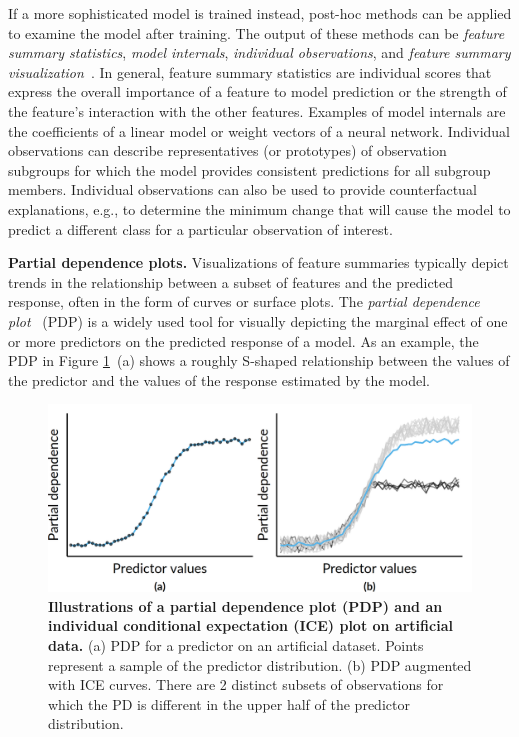 \documentclass[
  oneside]{book}
\begin{document}
If a more sophisticated model is trained instead, post-hoc methods can be applied to examine the model after training.
The output of these methods can be \emph{feature summary statistics}, \emph{model internals}, \emph{individual observations}, and \emph{feature summary visualization}~\autocite{molnar2020interpretable}.
In general, feature summary statistics are individual scores that express the overall importance of a feature to model prediction or the strength of the feature's interaction with the other features.
Examples of model internals are the coefficients of a linear model or weight vectors of a neural network.
Individual observations can describe representatives (or prototypes) of observation subgroups for which the model provides consistent predictions for all subgroup members.
Individual observations can also be used to provide counterfactual explanations, e.g., to determine the minimum change that will cause the model to predict a different class for a particular observation of interest.

\textbf{Partial dependence plots.} Visualizations of feature summaries typically depict trends in the relationship between a subset of features and the predicted response, often in the form of curves or surface plots.
The \emph{partial dependence plot}~\autocite{Friedman:PDP2001} (PDP) is a widely used tool for visually depicting the marginal effect of one or more predictors on the predicted response of a model.
As an example, the PDP in Figure \ref{fig:09-pd-intro}~(a) shows a roughly S-shaped relationship between the values of the predictor and the values of the response estimated by the model.



\begin{figure}

{\centering \includegraphics[width=0.5\linewidth]{figures/09-pd-intro} 

}

\caption{\textbf{Illustrations of a partial dependence plot (PDP) and an individual conditional expectation (ICE) plot on artificial data.} (a) PDP for a predictor on an artificial dataset. Points represent a sample of the predictor distribution. (b) PDP augmented with ICE curves. There are 2 distinct subsets of observations for which the PD is different in the upper half of the predictor distribution.}\label{fig:09-pd-intro}
\end{figure}
\end{document}
